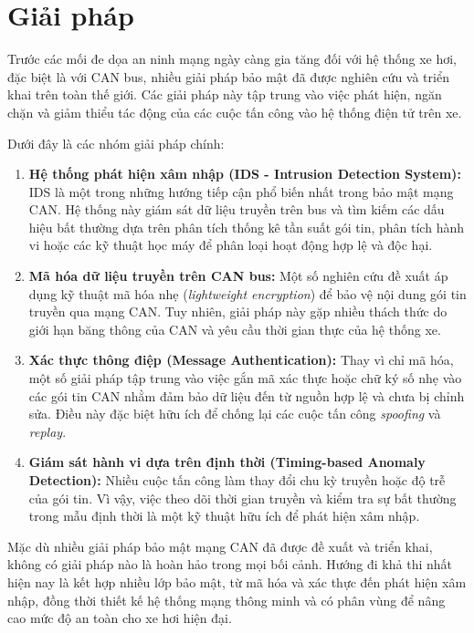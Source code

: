 \section{Giải pháp}
Trước các mối đe dọa an ninh mạng ngày càng gia tăng đối với hệ thống xe hơi, đặc biệt là với CAN bus, nhiều giải pháp bảo mật đã được nghiên cứu và triển khai trên toàn thế giới. Các giải pháp này tập trung vào việc phát hiện, ngăn chặn và giảm thiểu tác động của các cuộc tấn công vào hệ thống điện tử trên xe.

Dưới đây là các nhóm giải pháp chính:

\begin{enumerate}[label=\alph*., leftmargin=*]
    \item \textbf{Hệ thống phát hiện xâm nhập (IDS - Intrusion Detection System):} IDS là một trong những hướng tiếp cận phổ biến nhất trong bảo mật mạng CAN. Hệ thống này giám sát dữ liệu truyền trên bus và tìm kiếm các dấu hiệu bất thường dựa trên phân tích thống kê tần suất gói tin, phân tích hành vi hoặc các kỹ thuật học máy để phân loại hoạt động hợp lệ và độc hại.

    \item \textbf{Mã hóa dữ liệu truyền trên CAN bus:} Một số nghiên cứu đề xuất áp dụng kỹ thuật mã hóa nhẹ (\textit{lightweight encryption}) để bảo vệ nội dung gói tin truyền qua mạng CAN. Tuy nhiên, giải pháp này gặp nhiều thách thức do giới hạn băng thông của CAN và yêu cầu thời gian thực của hệ thống xe.

    \item \textbf{Xác thực thông điệp (Message Authentication):} Thay vì chỉ mã hóa, một số giải pháp tập trung vào việc gắn mã xác thực hoặc chữ ký số nhẹ vào các gói tin CAN nhằm đảm bảo dữ liệu đến từ nguồn hợp lệ và chưa bị chỉnh sửa. Điều này đặc biệt hữu ích để chống lại các cuộc tấn công \textit{spoofing} và \textit{replay}.

    \item \textbf{Giám sát hành vi dựa trên định thời (Timing-based Anomaly Detection):} Nhiều cuộc tấn công làm thay đổi chu kỳ truyền hoặc độ trễ của gói tin. Vì vậy, việc theo dõi thời gian truyền và kiểm tra sự bất thường trong mẫu định thời là một kỹ thuật hữu ích để phát hiện xâm nhập.

 
\end{enumerate}

Mặc dù nhiều giải pháp bảo mật mạng CAN đã được đề xuất và triển khai, không có giải pháp nào là hoàn hảo trong mọi bối cảnh. Hướng đi khả thi nhất hiện nay là kết hợp nhiều lớp bảo mật, từ mã hóa và xác thực đến phát hiện xâm nhập, đồng thời thiết kế hệ thống mạng thông minh và có phân vùng để nâng cao mức độ an toàn cho xe hơi hiện đại.
